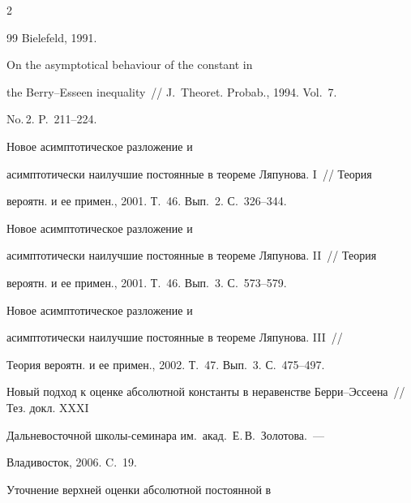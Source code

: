 \begin{multicols}{2}
{{\begin{thebibliography}{99}
Bielefeld, 1991.







 On the asymptotical behaviour of the constant in


the Berry--Esseen inequality~// J.~Theoret. Probab., 1994. Vol.~7.


No.\,2. P.~211--224.







 Новое асимптотическое разложение и


асимптотически наилучшие постоянные в теореме Ляпунова. I~// Теория


вероятн. и ее примен., 2001. Т.~46. Вып.~2. С.~326--344.







 Новое асимптотическое разложение и


асимптотически наилучшие постоянные в теореме Ляпунова. II~// Теория


вероятн. и ее примен., 2001. Т.~46. Вып.~3. С.~573--579.







 Новое асимптотическое разложение и


асимптотически наилучшие постоянные в теореме Ляпунова. III~//


Теория вероятн. и ее примен., 2002. Т.~47. Вып.~3. С.~475--497.









Новый подход к оценке абсолютной константы в неравенстве Берри--Эссеена~// Тез. докл. XXXI


Дальневосточной школы-семинара им.\ акад.\ Е.\,В.~Золотова.~---


Владивосток, 2006. C.~19.







 Уточнение верхней оценки абсолютной постоянной в



\end{thebibliography}}}
\end{multicols}
